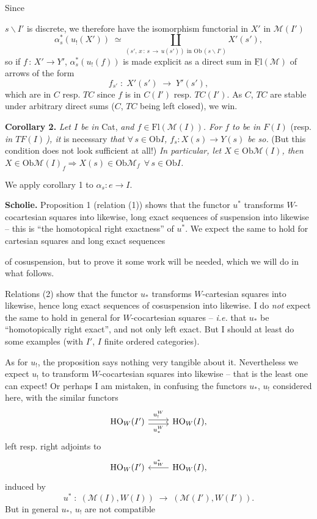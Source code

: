 \documentclass[11pt]{article}
\newcommand{\printedpage}[1]{\marginpar{\footnotesize p.~#1}}
\newcommand{\msp}[1]{\marginpar{\footnotesize [#1]}}
\newcommand{\M}{\mathcal{M}}
\newcommand{\Fl}{\mathrm{Fl}}
\newcommand{\Ob}{\mathrm{Ob}}
\newcommand{\HO}{\mathrm{HO}}
\begin{document}
Since

\noindent\msp{page 48}

\noindent $s\backslash I'$ is discrete, we therefore have the isomorphism functorial in $X'$ in $\M(I')$
\[
\alpha_s^*(u_{!}(X')) \;\simeq \coprod_{(s',\, x \,:\, s \,\longrightarrow\, u(s')) \text{ in } \Ob\,(s\backslash I')} X'(s'),
\]
so if $f \,:\, X' \longrightarrow Y'$, $\alpha_s^*(u_{!}(f))$ is made explicit as a direct sum in $\underline{\mathrm{Fl}}(\M)$ of arrows of the form
\[
f_{s'} \;:\; X'(s') \;\longrightarrow\; Y'(s'),
\]
\printedpage{28}
which are in $C$ resp. $TC$ since $f$ is in $C(I')$ resp. $TC(I')$. As $C$, $TC$ are stable under arbitrary direct sums ($C$, $TC$ being left closed), we win.

\textbf{Corollary 2.} \textit{Let $I$ be in} Cat, \textit{and $f \in \Fl(\M(I))$. For $f$ to be in $F(I)$} (resp. \textit{in $TF(I)$\,), it} is necessary \textit{that $\forall\, s \in \Ob I$, $f_s : X(s) \longrightarrow Y(s)$ be so.} (But this condition does not look sufficient at all!) \textit{In particular, let $X \in \Ob\M(I)$, then $X \in \Ob\M(I)_f \Longrightarrow X(s) \in \Ob\M_f \ \ \forall\, s \in \Ob I$.}

We apply corollary 1 to $\alpha_s : e \longrightarrow I$.

\textbf{Scholie.} Proposition 1 (relation (1)) shows that the functor $u^*$ transforms $W$-cocartesian squares into likewise, long exact sequences of suspension into likewise – this is ``the homotopical right exactness'' of $u^*$. We expect the same to hold for cartesian squares and long exact sequences

\noindent\msp{page 49}

\noindent of cosuspension, but to prove it some work will be needed, which we will do in what follows.

Relations (2) show that the functor $u_*$ transforms $W$-cartesian squares into likewise, hence long exact sequences of cosuspension into likewise. I do \textit{not} expect the same to hold in general for $W$-cocartesian squares – \textit{i.e.} that $u_*$ be ``homotopically right exact'', and not only left exact. But I should at least do some examples (with $I'$, $I$ finite ordered categories).

As for $u_{!}$, the proposition says nothing very tangible about it. Nevertheless we expect $u_{!}$ to transform $W$-cocartesian squares into likewise – that is the least one can expect! Or perhaps I am mistaken, in confusing the functors $u_*$, $u_{!}$ considered here, with the similar functors
\[
\begin{tikzcd}
\HO_W(I') \arrow[r, shift left, "u_{!}^W"] \arrow[r, shift right, "u_*^W"'] & \HO_W(I),
\end{tikzcd}
\]
left resp. right adjoints to
\[
\begin{tikzcd}
\HO_W(I') & \HO_W(I), \arrow[l, "u_W^*"']
\end{tikzcd}
\]
induced by
\[
u^* \;:\; (\M(I),W(I)) \;\longrightarrow\; (\M(I'),W(I')).
\]
But in general $u_*$, $u_{!}$ are not compatible
\end{document}
